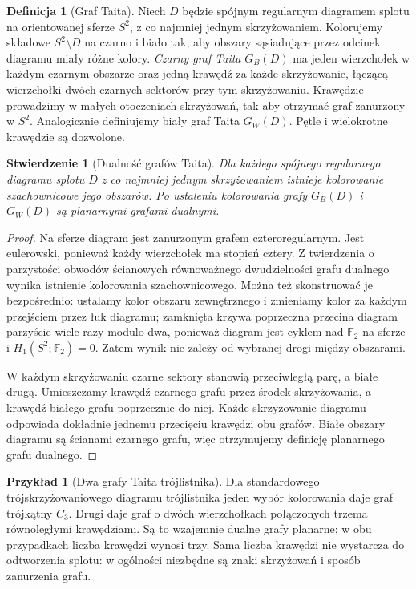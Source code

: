 \documentclass[11pt,a4paper]{report}
\numberwithin{equation}{section}
\theoremstyle{plain}
\newtheorem{stwierdzenie}[twierdzenie]{Stwierdzenie}
\theoremstyle{definition}
\newtheorem{definicja}[twierdzenie]{Definicja}
\newtheorem{przyklad}[twierdzenie]{Przykład}
\theoremstyle{remark}
\begin{document}
\begin{definicja}[Graf Taita]
Niech $D$ będzie spójnym regularnym diagramem splotu
na orientowanej sferze $S^2$, z co najmniej jednym
skrzyżowaniem. Kolorujemy składowe $S^2\setminus D$
na czarno i biało tak, aby obszary sąsiadujące przez
odcinek diagramu miały różne kolory. \emph{Czarny graf
Taita} $G_B(D)$ ma jeden wierzchołek w każdym czarnym
obszarze oraz jedną krawędź za każde skrzyżowanie,
łączącą wierzchołki dwóch czarnych sektorów przy tym
skrzyżowaniu. Krawędzie prowadzimy w małych otoczeniach
skrzyżowań, tak aby otrzymać graf zanurzony w $S^2$.
Analogicznie definiujemy biały graf Taita $G_W(D)$.
Pętle i wielokrotne krawędzie są dozwolone.
\end{definicja}

\begin{stwierdzenie}[Dualność grafów Taita]
Dla każdego spójnego regularnego diagramu splotu $D$
z co najmniej jednym skrzyżowaniem istnieje kolorowanie
szachownicowe jego obszarów. Po ustaleniu kolorowania
grafy $G_B(D)$ i $G_W(D)$ są planarnymi grafami dualnymi.
\end{stwierdzenie}
\begin{proof}
Na sferze diagram jest zanurzonym grafem czteroregularnym.
Jest eulerowski, ponieważ każdy wierzchołek ma stopień
cztery. Z twierdzenia o parzystości obwodów ścianowych
równoważnego dwudzielności grafu dualnego wynika
istnienie kolorowania szachownicowego. Można też
skonstruować je bezpośrednio: ustalamy kolor obszaru
zewnętrznego i zmieniamy kolor za każdym przejściem
przez łuk diagramu; zamknięta krzywa poprzeczna przecina
diagram parzyście wiele razy modulo dwa, ponieważ diagram
jest cyklem nad $\mathbb F_2$ na sferze i
$H_1(S^2;\mathbb F_2)=0$. Zatem wynik nie zależy od
wybranej drogi między obszarami.

W każdym skrzyżowaniu czarne sektory stanowią przeciwległą
parę, a białe drugą. Umieszczamy krawędź czarnego grafu
przez środek skrzyżowania, a krawędź białego grafu
poprzecznie do niej. Każde skrzyżowanie diagramu odpowiada
dokładnie jednemu przecięciu krawędzi obu grafów.
Białe obszary diagramu są ścianami czarnego grafu,
więc otrzymujemy definicję planarnego grafu dualnego.
\end{proof}

\begin{przyklad}[Dwa grafy Taita trójlistnika]
Dla standardowego trójskrzyżowaniowego diagramu trójlistnika
jeden wybór kolorowania daje graf trójkątny $C_3$.
Drugi daje graf o dwóch wierzchołkach połączonych trzema
równoległymi krawędziami. Są to wzajemnie dualne grafy
planarne; w obu przypadkach liczba krawędzi wynosi trzy.
Sama liczba krawędzi nie wystarcza do odtworzenia splotu:
w ogólności niezbędne są znaki skrzyżowań i sposób
zanurzenia grafu.
\end{przyklad}
\end{document}
